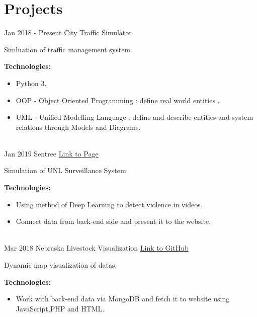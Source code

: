 \documentclass[letterpaper]{twentysecondcv} %
\begin{document}
\section{Projects}
\begin{twenty}
	\twentyitem
    	{Jan 2018 - }
		{Present}
        {City Traffic Simulator}
        {} %
        {}
        {
       	Simluation of traffic management system.
       	
       	\textbf{Technologies:}
        {\begin{itemize}
        \item Python 3.
        \item OOP - Object Oriented Programming : define real world entities .
        \item UML - Unified Modelling Language : define and describe entities and system relations
        through Models and Diagrams.
		\end{itemize}}
        }
    \\
        \twentyitem
    	{Jan 2019}
		{}
        {Sentree}
        {\href{https://datduyng.github.io/cornhack2019/}{Link to Page}} %
        {}
        {
       	Simulation of UNL Surveillance System
       	
       	\textbf{Technologies:}
        {\begin{itemize}
        \item Using method of Deep Learning to detect violence in videos.
        \item Connect data from back-end side and present it to the website.
		\end{itemize}}
        }
        \\
    \twentyitem
    	{Mar 2018}
		{}
        {Nebraska Livestock Visualization}
        {\href{https://github.com/HuyNVuong/Nebraska-livestock-Visualisation}{Link to GitHub}} %
        {}
        {
       	Dynamic map visualization of datas.
       	
       	\textbf{Technologies:}
        {\begin{itemize}
        \item Work with back-end data via MongoDB and fetch it to website using JavaScript,PHP and HTML.
		\end{itemize}}
        }

\end{twenty}
\end{document}
